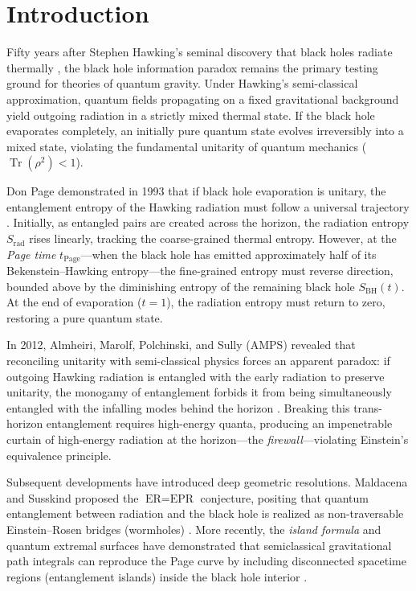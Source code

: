 \documentclass[11pt,a4paper]{article}
\begin{document}
\section{Introduction}\label{sec:intro}
Fifty years after Stephen Hawking's seminal discovery that black holes radiate thermally \cite{hawking1975,hawking1976}, the black hole information paradox remains the primary testing ground for theories of quantum gravity. Under Hawking's semi-classical approximation, quantum fields propagating on a fixed gravitational background yield outgoing radiation in a strictly mixed thermal state. If the black hole evaporates completely, an initially pure quantum state evolves irreversibly into a mixed state, violating the fundamental unitarity of quantum mechanics ($\operatorname{Tr}(\rho^2) < 1$).

Don Page demonstrated in 1993 that if black hole evaporation is unitary, the entanglement entropy of the Hawking radiation must follow a universal trajectory \cite{page1993a,page1993b,page2013}. Initially, as entangled pairs are created across the horizon, the radiation entropy $S_{\text{rad}}$ rises linearly, tracking the coarse-grained thermal entropy. However, at the \emph{Page time} $t_{\text{Page}}$---when the black hole has emitted approximately half of its Bekenstein--Hawking entropy---the fine-grained entropy must reverse direction, bounded above by the diminishing entropy of the remaining black hole $S_{\text{BH}}(t)$. At the end of evaporation ($t=1$), the radiation entropy must return to zero, restoring a pure quantum state.

In 2012, Almheiri, Marolf, Polchinski, and Sully (AMPS) revealed that reconciling unitarity with semi-classical physics forces an apparent paradox: if outgoing Hawking radiation is entangled with the early radiation to preserve unitarity, the monogamy of entanglement forbids it from being simultaneously entangled with the infalling modes behind the horizon \cite{amps}. Breaking this trans-horizon entanglement requires high-energy quanta, producing an impenetrable curtain of high-energy radiation at the horizon---the \emph{firewall}---violating Einstein's equivalence principle.

Subsequent developments have introduced deep geometric resolutions. Maldacena and Susskind proposed the $\text{ER}=\text{EPR}$ conjecture, positing that quantum entanglement between radiation and the black hole is realized as non-traversable Einstein--Rosen bridges (wormholes) \cite{erepr}. More recently, the \emph{island formula} and quantum extremal surfaces have demonstrated that semiclassical gravitational path integrals can reproduce the Page curve by including disconnected spacetime regions (entanglement islands) inside the black hole interior \cite{penington,aemm,ammz,review}.
\end{document}
